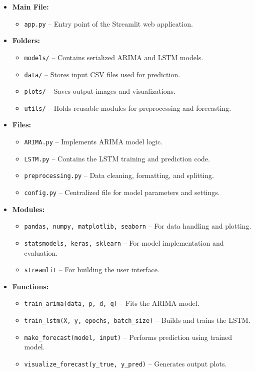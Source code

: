 \begin{itemize}
	\item \textbf{Main File:}
	\begin{itemize}
		\item \texttt{app.py} – Entry point of the Streamlit web application.
	\end{itemize}
	
	\item \textbf{Folders:}
	\begin{itemize}
		\item \texttt{models/} – Contains serialized ARIMA and LSTM models.
		\item \texttt{data/} – Stores input CSV files used for prediction.
		\item \texttt{plots/} – Saves output images and visualizations.
		\item \texttt{utils/} – Holds reusable modules for preprocessing and forecasting.
	\end{itemize}
	
	\item \textbf{Files:}
	\begin{itemize}
		\item \texttt{ARIMA.py} – Implements ARIMA model logic.
		\item \texttt{LSTM.py} – Contains the LSTM training and prediction code.
		\item \texttt{preprocessing.py} – Data cleaning, formatting, and splitting.
		\item \texttt{config.py} – Centralized file for model parameters and settings.
	\end{itemize}
	
	\item \textbf{Modules:}
	\begin{itemize}
		\item \texttt{pandas, numpy, matplotlib, seaborn} – For data handling and plotting.
		\item \texttt{statsmodels, keras, sklearn} – For model implementation and evaluation.
		\item \texttt{streamlit} – For building the user interface.
	\end{itemize}
	
	\item \textbf{Functions:}
	\begin{itemize}
		\item \texttt{train\_arima(data, p, d, q)} – Fits the ARIMA model.
		\item \texttt{train\_lstm(X, y, epochs, batch\_size)} – Builds and trains the LSTM.
		\item \texttt{make\_forecast(model, input)} – Performs prediction using trained model.
		\item \texttt{visualize\_forecast(y\_true, y\_pred)} – Generates output plots.
	\end{itemize}
	

\end{itemize}
